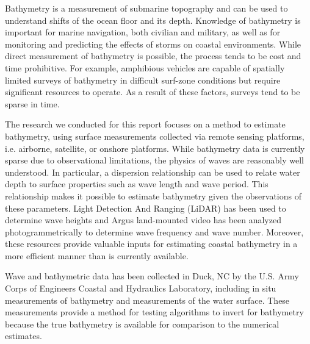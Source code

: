 Bathymetry is a measurement of submarine topography and can be used to understand shifts of the ocean floor and its depth. Knowledge of bathymetry is important for marine navigation, both civilian and military, as well as for monitoring and predicting the effects of storms on coastal environments. While direct measurement of bathymetry is possible, the process tends to be cost and time prohibitive. For example, amphibious vehicles are capable of spatially limited surveys of bathymetry in difficult surf-zone conditions but require significant resources to operate. As a result of these factors, surveys tend to be sparse in time. 

The research we conducted for this report focuses on a method to estimate bathymetry, using surface measurements collected via remote sensing platforms, i.e. airborne, satellite, or onshore platforms. While bathymetry data is currently sparse due to observational limitations, the physics of waves are reasonably well understood. In particular, a dispersion relationship can be used to relate water depth to surface properties such as wave length and wave period. This relationship makes it possible to estimate bathymetry given the observations of these parameters. Light Detection And Ranging (LiDAR) has been used to determine wave heights and Argus land-mounted video has been analyzed photogrammetrically to determine wave frequency and wave number. Moreover, these resources  provide valuable inputs for estimating coastal bathymetry in a more efficient manner than is currently available.

Wave and bathymetric data has been collected in Duck, NC by the U.S. Army Corps of Engineers Coastal and Hydraulics Laboratory, including in situ measurements of bathymetry and measurements of the water surface. These measurements provide a method for testing algorithms to invert for bathymetry because the true bathymetry is available for comparison to the numerical estimates.

